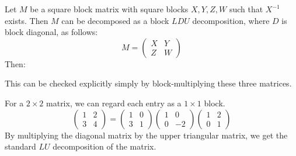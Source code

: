 Let $M$ be a square block matrix with square blocks $X,Y,Z,W$ such that $X^{-1}$ exists.  Then $M$ can be decomposed as a block $LDU$ decomposition, where $D$ is block diagonal, as follows:
\[
M=\begin{pmatrix}
X & Y \\
Z & W
\end{pmatrix}
\]
Then: 
\begin{center}
\end{center}
This can be checked explicitly simply by block-multiplying these three matrices.


\begin{example}
For a $2\times 2$ matrix, we can regard each entry as a $1\times1$ block.
\[
\begin{pmatrix}
1 & 2 \\
3 & 4
\end{pmatrix}=
\begin{pmatrix}
1 & 0 \\
3 & 1
\end{pmatrix}
\begin{pmatrix}
1 & 0 \\
0 & -2
\end{pmatrix}
\begin{pmatrix}
1 & 2 \\
0 & 1
\end{pmatrix}
\]
By multiplying the diagonal matrix by the upper triangular matrix, we get the standard $LU$ decomposition of the matrix.
\end{example}


